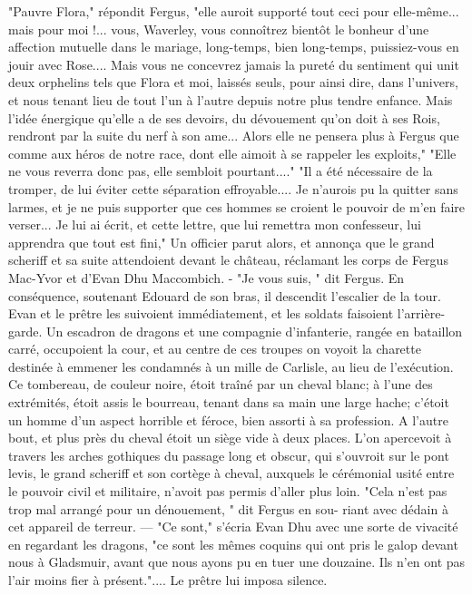 {"Pauvre Flora," répondit Fergus, "elle auroit supporté tout ceci pour elle-même... mais pour moi !... vous, Waverley, vous connoîtrez bientôt le bonheur d'une affection mutuelle dans le mariage, long-temps, bien long-temps, puissiez-vous en jouir avec Rose.... Mais vous ne concevrez jamais la pureté du sentiment qui unit deux orphelins tels que Flora et moi, laissés seuls, pour ainsi dire, dans l'univers, et nous tenant lieu de tout l'un à l'autre depuis notre plus tendre enfance. Mais l'idée énergique qu'elle a de ses devoirs, du dévouement qu'on doit à ses Rois, rendront par la suite du nerf à son ame... Alors elle ne pensera plus à Fergus que comme aux héros de notre race, dont elle aimoit à se rappeler les exploits,"
"Elle ne vous reverra donc pas, elle sembloit pourtant...."
"Il a été nécessaire de la tromper, de lui éviter cette séparation effroyable.... Je n'aurois pu la quitter sans larmes, et je ne puis supporter que ces hommes se croient le pouvoir de m'en faire verser... Je lui ai écrit, et cette lettre, que lui remettra mon confesseur, lui apprendra que tout est fini,"\setcounter{page}{390} Un officier parut alors, et annonça que le grand scheriff et sa suite attendoient devant le château, réclamant les corps de Fergus Mac-Yvor et d'Evan Dhu Maccombich. - "Je vous suis, " dit Fergus. En conséquence, soutenant Edouard de son bras, il descendit l'escalier de la tour. Evan et le prêtre les suivoient immédiatement, et les soldats faisoient l'arrière-garde.
Un escadron de dragons et une compagnie d'infanterie, rangée en bataillon carré, occupoient la cour, et au centre de ces troupes on voyoit la charette destinée à emmener les condamnés à un mille de Carlisle, au lieu de l'exécution. Ce tombereau, de couleur noire, étoit traîné par un cheval blanc; à l'une des extrémités, étoit assis le bourreau, tenant dans sa main une large hache; c'étoit un homme d'un aspect horrible et féroce, bien assorti à sa profession. A l'autre bout, et plus près du cheval étoit un siège vide à deux places. L'on apercevoit à travers les arches gothiques du passage long et obscur, qui s'ouvroit sur le pont levis, le grand scheriff et son cortège à cheval, auxquels le cérémonial usité entre le pouvoir civil et militaire, n'avoit pas permis d'aller plus loin. "Cela n'est pas trop mal arrangé pour un dénouement, " dit Fergus en sou-\setcounter{page}{391} riant avec dédain à cet appareil de terreur. — "Ce sont," s’écria Evan Dhu avec une sorte de vivacité en regardant les dragons, "ce sont les mêmes coquins qui ont pris le galop devant nous à Gladsmuir, avant que nous ayons pu en tuer une douzaine. Ils n’en ont pas l’air moins fier à présent.".... Le prêtre lui imposa silence.
}
